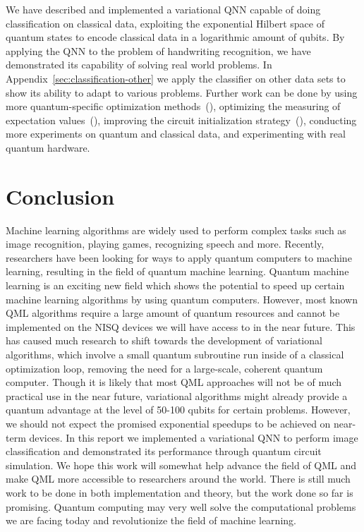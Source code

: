 \documentclass[a4paper,10pt]{article}
\begin{document}
We have described and implemented a variational QNN capable of doing classification on classical data, exploiting the exponential Hilbert space of quantum states to encode classical data in a logarithmic amount of qubits.
By applying the QNN to the problem of handwriting recognition, we have demonstrated its capability of solving real world problems.
In Appendix~\ref{sec:classification-other} we apply the classifier on other data sets to show its ability to adapt to various problems.
Further work can be done by using more quantum-specific optimization methods~(\cite{stokes2019quantum}), optimizing the measuring of expectation values~(\cite{sweke2019stochastic}), improving the circuit initialization strategy~(\cite{mcclean2018barren}), conducting more experiments on quantum and classical data, and experimenting with real quantum hardware.

\section{Conclusion} \label{sec:conclusion}
Machine learning algorithms are widely used to perform complex tasks such as image recognition, playing games, recognizing speech and more.
Recently, researchers have been looking for ways to apply quantum computers to machine learning, resulting in the field of quantum machine learning.
Quantum machine learning is an exciting new field which shows the potential to speed up certain machine learning algorithms by using quantum computers.
However, most known QML algorithms require a large amount of quantum resources and cannot be implemented on the NISQ devices we will have access to in the near future.
This has caused much research to shift towards the development of variational algorithms, which involve a small quantum subroutine run inside of a classical optimization loop, removing the need for a large-scale, coherent quantum computer. 
Though it is likely that most QML approaches will not be of much practical use in the near future, variational algorithms might already provide a quantum advantage at the level of 50-100 qubits for certain problems.
However, we should not expect the promised exponential speedups to be achieved on near-term devices.
In this report we implemented a variational QNN to perform image classification and demonstrated its performance through quantum circuit simulation.
We hope this work will somewhat help advance the field of QML and make QML more accessible to researchers around the world.
There is still much work to be done in both implementation and theory, but the work done so far is promising.
Quantum computing may very well solve the computational problems we are facing today and revolutionize the field of machine learning.
\end{document}

